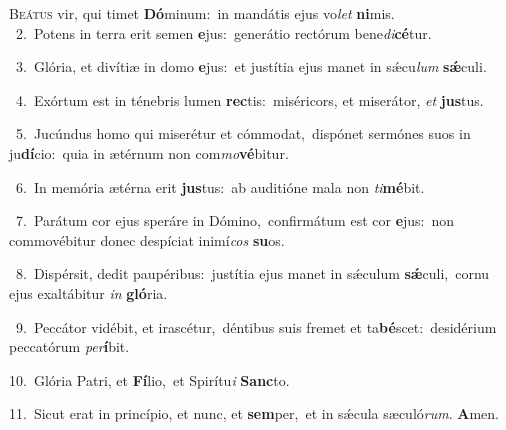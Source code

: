 \lettrine{\initial\textcolor{\initialcolor}{B}}{eátus} vir, qui timet \textbf{Dó}\-minum:~\star in mandátis ejus vo\textit{let} \textbf{ni}\-mis.\\
{\numbfont\textcolor{\numbcolor}{~2.}}~Potens in terra erit semen \textbf{e}\-jus:~\star generátio rectórum bene\-\textit{di}\-\textbf{cé}tur.\par
{\numbfont\textcolor{\numbcolor}{~3.}}~Glória, et divítiæ in domo \textbf{e}\-jus:~\star et justítia ejus manet in sǽcu\textit{lum} \textbf{sǽ}\-culi.\par
{\numbfont\textcolor{\numbcolor}{~4.}}~Exórtum est in ténebris lumen \textbf{rec}\-tis:~\star miséricors, et miserátor, \textit{et} \textbf{jus}\-tus.\par
{\numbfont\textcolor{\numbcolor}{~5.}}~Jucúndus homo qui miserétur et cómmodat,~\dagger dispónet sermónes suos in ju\-\textbf{dí}\-cio:~\star quia in ætérnum non com\-\textit{mo}\-\textbf{vé}bitur.\par
{\numbfont\textcolor{\numbcolor}{~6.}}~In memória ætérna erit \textbf{jus}\-tus:~\star ab auditióne mala non \textit{ti}\-\textbf{mé}bit.\par
{\numbfont\textcolor{\numbcolor}{~7.}}~Parátum cor ejus speráre in Dómino,~\dagger confirmátum est cor \textbf{e}\-jus:~\star non commovébitur donec despíciat inimí\textit{cos} \textbf{su}\-os.\par
{\numbfont\textcolor{\numbcolor}{~8.}}~Dispérsit, dedit paupéribus:~\dagger justítia ejus manet in sǽculum \textbf{sǽ}\-culi,~\star cornu ejus exaltábitur \textit{in} \textbf{gló}\-ria.\par
{\numbfont\textcolor{\numbcolor}{~9.}}~Peccátor vidébit, et irascétur,~\dagger déntibus suis fremet et ta\-\textbf{bé}\-scet:~\star desidérium peccatórum \textit{per}\-\textbf{í}bit.\par
{\numbfont\textcolor{\numbcolor}{10.}}~Glória Patri, et \textbf{Fí}\-lio,~\star et Spirítu\textit{i} \textbf{Sanc}\-to.\par
{\numbfont\textcolor{\numbcolor}{11.}}~Sicut erat in princípio, et nunc, et \textbf{sem}\-per,~\star et in sǽcula sæculó\-\textit{rum}\-. \textbf{A}\-men.\par
